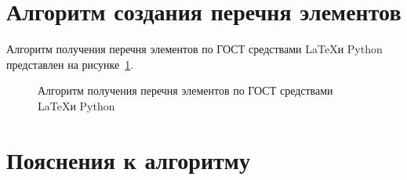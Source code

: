 \section{Алгоритм создания перечня элементов}

Алгоритм получения перечня элементов по ГОСТ средствами \LaTeX и Python представлен на рисунке~\ref{f:diagram}.

\begin{figure} [H] 
  \centering
  
  \caption{Алгоритм получения перечня элементов по ГОСТ средствами \LaTeX и Python} 
  \label{f:diagram} 
\end{figure}

\section{Пояснения к алгоритму}

